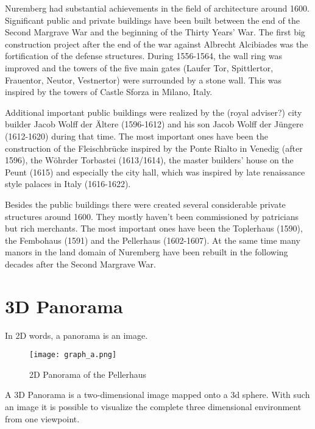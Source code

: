 Nuremberg had substantial achievements in the field of architecture around 1600. Significant public and private buildings have been built between the end of the Second Margrave War and the beginning of the Thirty Years' War.
The first big construction project after the end of the war against Albrecht Alcibiades was the fortification of the defense structures. During 1556-1564, the wall ring was improved and the towers of the five main gates (Laufer Tor, Spittlertor, Frauentor, Neutor, Vestnertor) were surrounded by a stone wall. This was inspired by the towers of Castle Sforza in Milano, Italy.

Additional important public buildings were realized by the (royal adviser?) city builder Jacob Wolff der Ältere (1596-1612) and his son Jacob Wolff der Jüngere (1612-1620) during that time. The most important ones have been the construction of the Fleischbrücke inspired by the Ponte Rialto in Venedig (after 1596), the Wöhrder Torbastei (1613/1614), the master builders' house on the Peunt (1615) and especially the city hall, which was inspired by late renaissance style palaces in Italy (1616-1622).

Besides the public buildings there were created several considerable private structures around 1600. They mostly haven't been commissioned by patricians but rich merchants. The most important ones have been the Toplerhaus (1590), the Fembohaus (1591) and the Pellerhaus (1602-1607).
At the same time many manors in the land domain of Nuremberg have been rebuilt in the following decades after the Second Margrave War.

\parencite[translated from German]{bookAcademiaNorica}




\section{3D Panorama}

In 2D words, a panorama is an image.

\begin{figure}[h]
	\centering
	\texttt{[image: graph\_a.png]}
	\caption{2D Panorama of the Pellerhaus}
	\label{fig:2d_panorama}
\end{figure}


A 3D Panorama is a two-dimensional image mapped onto a 3d sphere. With such an image it is possible to visualize the complete three dimensional environment from one viewpoint.

\pagestyle{fancy}

